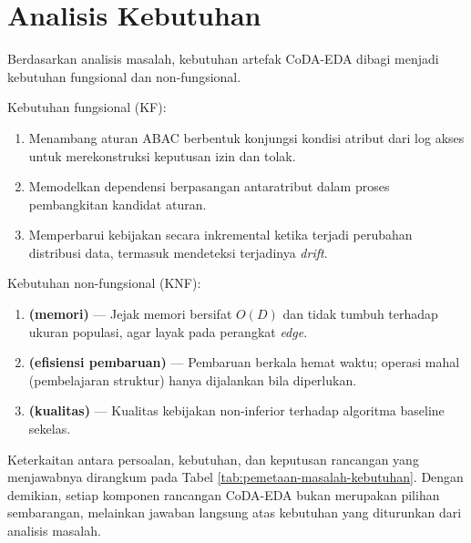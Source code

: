 \section{Analisis Kebutuhan}

Berdasarkan analisis masalah, kebutuhan artefak CoDA-EDA dibagi menjadi kebutuhan fungsional dan non-fungsional.

Kebutuhan fungsional (KF):
\begin{enumerate}[label=\textbf{KF\arabic*.}, leftmargin=*]
    \item Menambang aturan ABAC berbentuk konjungsi kondisi atribut dari log akses untuk merekonstruksi keputusan izin dan tolak.
    \item Memodelkan dependensi berpasangan antaratribut dalam proses pembangkitan kandidat aturan.
    \item Memperbarui kebijakan secara inkremental ketika terjadi perubahan distribusi data, termasuk mendeteksi terjadinya \textit{drift}.
\end{enumerate}

Kebutuhan non-fungsional (KNF):
\begin{enumerate}[label=\textbf{KNF\arabic*.}, leftmargin=*]
    \item[\textbf{KNF1}] \textbf{(memori)} --- Jejak memori bersifat $O(D)$ dan tidak tumbuh terhadap ukuran populasi, agar layak pada perangkat \textit{edge}.
    \item[\textbf{KNF2}] \textbf{(efisiensi pembaruan)} --- Pembaruan berkala hemat waktu; operasi mahal (pembelajaran struktur) hanya dijalankan bila diperlukan.
    \item[\textbf{KNF3}] \textbf{(kualitas)} --- Kualitas kebijakan non-inferior terhadap algoritma baseline sekelas.
\end{enumerate}

Keterkaitan antara persoalan, kebutuhan, dan keputusan rancangan yang menjawabnya dirangkum pada Tabel \ref{tab:pemetaan-masalah-kebutuhan}.
Dengan demikian, setiap komponen rancangan CoDA-EDA bukan merupakan pilihan sembarangan, melainkan jawaban langsung atas kebutuhan yang diturunkan dari analisis masalah.


